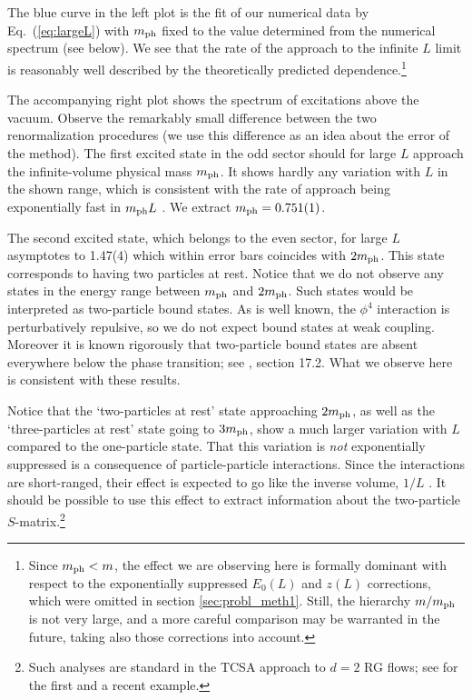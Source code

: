 \documentclass[11pt]{article}
\newcommand{\reef}[1]{(\ref{#1})}
\def\phys{{\rm ph}}
\def\ph{{\rm ph}}
\numberwithin{equation}{section}
\begin{document}
The blue curve in the left plot is the fit of our numerical data by Eq.~\reef{eq:largeL} with $m_\phys$ fixed to the value determined from the numerical spectrum (see below). We see that the rate of the approach to the infinite $L$ limit is reasonably well described by the theoretically predicted dependence.\footnote{Since $m_{\rm \ph} < m$, the effect we are observing here is formally dominant with respect to the exponentially suppressed $E_0(L)$ and $z(L)$ corrections, which were omitted in section \ref{sec:probl_meth1}. Still, the hierarchy $m/m_{\rm \ph}$ is not very large, and a more careful comparison may be warranted in the future, taking also those corrections into account.}
  

The accompanying right plot shows the spectrum of excitations above the vacuum. Observe the remarkably small difference between the two renormalization procedures (we use this difference as an idea about the error of the method).
The first excited state in the odd sector should for large $L$ approach the infinite-volume physical mass $m_\phys$. It shows hardly any variation with $L$ in the shown range, which is consistent with the rate of approach being exponentially fast in $m_\phys L$ \cite{Luscher:1985dn}. We extract $m_\phys=0.751(1)$.

The second excited state, which belongs to the even sector, for large $L$ asymptotes to 1.47(4) which within error bars coincides with $2 m_\phys$. This state corresponds to having two particles at rest. Notice that we do not observe any states in the energy range between $m_\phys$ and $2 m_\phys$. Such states would be interpreted as two-particle bound states. As is well known, the $\phi^4$ interaction is perturbatively repulsive, so we do not expect bound states at weak coupling. Moreover it is known rigorously that two-particle bound states are absent everywhere below the phase transition; see \cite{Glimm:1987ng}, section 17.2. What we observe here is consistent with these results.

Notice that the `two-particles at rest' state approaching $2m_\ph$, as well as the `three-particles at rest' state going to $3 m_\ph$, show a much larger variation with $L$ compared to the one-particle state. That this variation is \emph{not} exponentially suppressed is a consequence of particle-particle interactions. Since the interactions are short-ranged, their effect is expected to go like the inverse volume, $1/L$ \cite{Luscher:1986pf}. It should be possible to use this effect to extract information about the two-particle $S$-matrix.\footnote{Such analyses are standard in the TCSA approach to $d=2$ RG flows; see \cite{Yurov:1991my,Lencses:2014tba} for the first and a recent example.}
\end{document}
